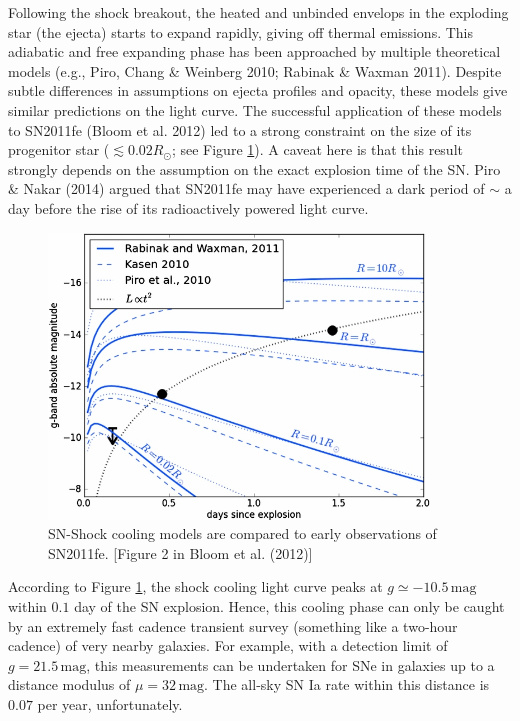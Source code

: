 \documentclass[11pt]{article}
\begin{document}
Following the shock breakout, the heated and unbinded envelops in the
exploding star (the ejecta) starts to expand rapidly, giving off
thermal emissions. This adiabatic and free expanding phase has been
approached by multiple theoretical models (e.g., Piro, Chang \&
Weinberg 2010; Rabinak \& Waxman 2011). Despite subtle differences in
assumptions on ejecta profiles and opacity, these models give similar
predictions on the light curve. The successful application of these
models to SN2011fe (Bloom et al. 2012) led to a strong constraint on
the size of its progenitor star ($\lesssim0.02R_\odot$; see Figure
\ref{fig:shock_breakout}). A caveat here is that this result strongly
depends on the assumption on the exact explosion time of the SN. Piro
\& Nakar (2014) argued that SN2011fe may have experienced a dark period of
$\sim$ a day before the rise of its radioactively powered light curve.

\begin{figure}[htb]
  \centering
  \includegraphics[width=0.9\textwidth]{shock_breakout.jpg}
  \caption{SN-Shock cooling models are compared to early observations
    of SN2011fe. [Figure 2 in Bloom et al. (2012)]}
  \label{fig:shock_breakout}
\end{figure}

According to Figure \ref{fig:shock_breakout}, the shock cooling light
curve peaks at $g\simeq -10.5\,\textrm{mag}$ within $0.1$ day of the
SN explosion.  Hence, this cooling phase can only be caught by an
extremely fast cadence transient survey (something like a two-hour
cadence) of very nearby galaxies. For example, with a detection limit
of $g=21.5\,\textrm{mag}$, this measurements can be undertaken for SNe
in galaxies up to a distance modulus of $\mu=32\,\textrm{mag}$. The
all-sky SN Ia rate within this distance is $0.07$ per year,
unfortunately.
\end{document}
